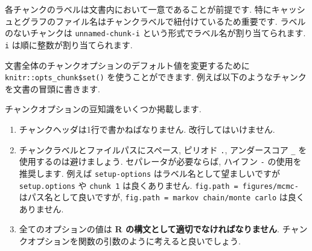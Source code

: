 \documentclass[
  lualatex,ja=standard,jafont=noto-otf]{bxjsreport}
\newenvironment{Shaded}{\begin{snugshade}}{\end{snugshade}}
\newcommand{\NormalTok}[1]{#1}
\providecommand{\tightlist}{%
  \setlength{\itemsep}{0pt}\setlength{\parskip}{0pt}}
\begin{document}
各チャンクのラベルは文書内において一意であることが前提です.
特にキャッシュとグラフのファイル名はチャンクラベルで紐付けているため重要です.
ラベルのないチャンクは \texttt{unnamed-chunk-i}
という形式でラベル名が割り当てられます. \texttt{i}
は順に整数が割り当てられます.

文書全体のチャンクオプションのデフォルト値を変更するために
\texttt{knitr::opts\_chunk\$set()} を使うことができます.
例えば以下のようなチャンクを文書の冒頭に書きます.

\begin{Shaded}
\end{Shaded}

チャンクオプションの豆知識をいくつか掲載します.

\begin{enumerate}
\def\labelenumi{\arabic{enumi}.}
\tightlist
\item
  チャンクヘッダは1行で書かねばなりません. 改行してはいけません.
\item
  チャンクラベルとファイルパスにスペース, ピリオド \texttt{.},
  アンダースコア \texttt{\_} を使用するのは避けましょう.
  セパレータが必要ならば, ハイフン \texttt{-} の使用を推奨します. 例えば
  \texttt{setup-options} はラベル名として望ましいですが
  \texttt{setup.options} や \texttt{chunk\ 1} は良くありません.
  \texttt{fig.path\ =\ \textquotesingle{}figures/mcmc-\textquotesingle{}}
  はパス名として良いですが,
  \texttt{fig.path\ =\ \textquotesingle{}markov\ chain/monte\ carlo\textquotesingle{}}
  は良くありません.
\item
  全てのオプションの値は \textbf{R
  の構文として適切でなければなりません}.
  チャンクオプションを関数の引数のように考えると良いでしょう.
\end{enumerate}
\end{document}
